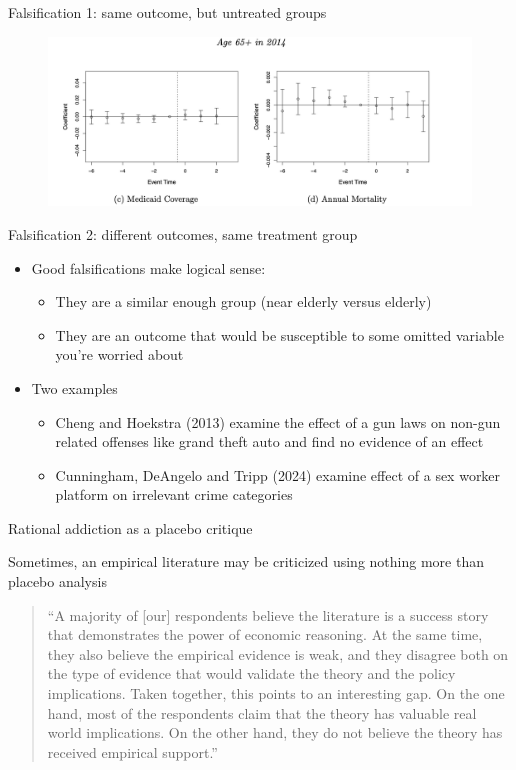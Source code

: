 \documentclass{beamer}
\begin{document}
\begin{frame}{Falsification 1: same outcome, but untreated groups}

		\begin{figure}
		\includegraphics[scale=0.425]{./lecture_includes/placebo_medicaid}
		\end{figure}

\end{frame}

\begin{frame}{Falsification 2: different outcomes, same treatment group}
	\begin{itemize}
	\item Good falsifications make logical sense:
		\begin{itemize}
		\item They are a similar enough group (near elderly versus elderly)
		\item They are an outcome that would be susceptible to some omitted variable you're worried about
		\end{itemize}
	\item Two examples
		\begin{itemize}
		\item Cheng and Hoekstra (2013) examine the effect of a gun laws on non-gun related offenses like grand theft auto and find no evidence of an effect
		\item Cunningham, DeAngelo and Tripp (2024) examine effect of a sex worker platform on irrelevant crime categories
		\end{itemize}
	\end{itemize}
\end{frame}



\begin{frame}{Rational addiction as a placebo critique}


Sometimes, an empirical literature may be criticized using nothing more than placebo analysis

\begin{quote}``A majority of [our] respondents believe the literature is a success story that demonstrates the power of economic reasoning.  At the same time, they also believe the empirical evidence is weak, and they disagree both on the type of evidence that would validate the theory and the policy implications. Taken together, this points to an interesting gap.  On the one hand, most of the respondents claim that the theory has valuable real world implications.  On the other hand, they do not believe the theory has received empirical support.''
\end{quote}

\end{frame}
\end{document}
